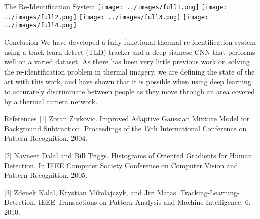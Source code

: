 \documentclass[final]{beamer}
\begin{document}
\begin{frame}{}
\begin{columns}[t]
\begin{column}{.5\linewidth}
\begin{block}{The Re-Identification System}
 		\texttt{[image: ../images/full1.png]}  
 		\vspace{.05cm}
 		\texttt{[image: ../images/full2.png]}
 		\vspace{.05cm}
        \texttt{[image: ../images/full3.png]} 
        \vspace{.05cm}
        \texttt{[image: ../images/full4.png]} 
        \end{block}
        
       	\begin{block}{Conclusion}
		We have developed a fully functional thermal re-identification system using a track-learn-detect (TLD) tracker and a deep siamese CNN that performs well on a varied dataset. As there has been very little previous work on solving the re-identification problem in thermal imagery, we are defining the state of the art with this work, and have shown that it is possible when using deep learning to accurately discriminate between people as they move through an area covered by a thermal camera network.
        
        \end{block}
        
        \begin{block}{References}
		\small
[1] Zoran Zivkovic. Improved Adaptive Gaussian Mixture Model for Background Subtraction. Proceedings of the 17th International Conference on Pattern Recognition, 2004.
    
[2] Navneet Dalal and Bill Triggs. Histograms of Oriented Gradients for Human Detection. In IEEE Computer Society Conference on Computer Vision and Pattern Recognition, 2005.

[3] Zdenek Kalal, Krystian Mikolajczyk, and Jiri Matas. Tracking-Learning-Detection. IEEE Transactions on Pattern Analysis and Machine Intelligence, 6, 2010.
		
    \end{block}

      \end{column}
    \end{columns}
     

  \end{frame}
\end{document}
